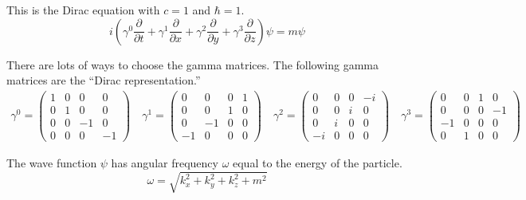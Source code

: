 \documentclass[12pt]{article}
\begin{document}
\noindent
This is the Dirac equation with $c=1$ and $\hbar=1$.
\begin{equation*}
i\left(
\gamma^0\frac{\partial}{\partial t}+
\gamma^1\frac{\partial}{\partial x}+
\gamma^2\frac{\partial}{\partial y}+
\gamma^3\frac{\partial}{\partial z}
\right)\psi
=m\psi
\end{equation*}

\noindent
There are lots of ways to choose the gamma matrices.
The following gamma matrices are the ``Dirac representation.''
{\small
\begin{gather*}
\gamma^0=\begin{pmatrix}1&0&0&0\\0&1&0&0\\0&0&-1&0\\0&0&0&-1\end{pmatrix}\quad
\gamma^1=\begin{pmatrix}0&0&0&1\\0&0&1&0\\0&-1&0&0\\-1&0&0&0\end{pmatrix}\quad
\gamma^2=\begin{pmatrix}0&0&0&-i\\0&0&i&0\\0&i&0&0\\-i&0&0&0\end{pmatrix}\quad
\gamma^3=\begin{pmatrix}0&0&1&0\\0&0&0&-1\\-1&0&0&0\\0&1&0&0\end{pmatrix}
\end{gather*}
}

\noindent
The wave function $\psi$ has angular frequency $\omega$ equal to the energy of the particle.
$$
\omega=\sqrt{k_x^2+k_y^2+k_z^2+m^2}
$$
\end{document}
